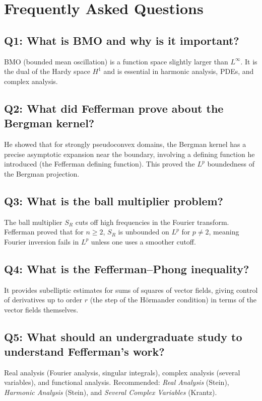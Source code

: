\section{Frequently Asked Questions}

\subsection*{Q1: What is BMO and why is it important?}
BMO (bounded mean oscillation) is a function space slightly larger than $L^\infty$. It is the dual of the Hardy space $H^1$ and is essential in harmonic analysis, PDEs, and complex analysis.

\subsection*{Q2: What did Fefferman prove about the Bergman kernel?}
He showed that for strongly pseudoconvex domains, the Bergman kernel has a precise asymptotic expansion near the boundary, involving a defining function he introduced (the Fefferman defining function). This proved the $L^p$ boundedness of the Bergman projection.

\subsection*{Q3: What is the ball multiplier problem?}
The ball multiplier $S_R$ cuts off high frequencies in the Fourier transform. Fefferman proved that for $n \geq 2$, $S_R$ is unbounded on $L^p$ for $p \neq 2$, meaning Fourier inversion fails in $L^p$ unless one uses a smoother cutoff.

\subsection*{Q4: What is the Fefferman--Phong inequality?}
It provides subelliptic estimates for sums of squares of vector fields, giving control of derivatives up to order $r$ (the step of the H\"ormander condition) in terms of the vector fields themselves.

\subsection*{Q5: What should an undergraduate study to understand Fefferman's work?}
Real analysis (Fourier analysis, singular integrals), complex analysis (several variables), and functional analysis. Recommended: \textit{Real Analysis} (Stein), \textit{Harmonic Analysis} (Stein), and \textit{Several Complex Variables} (Krantz).

